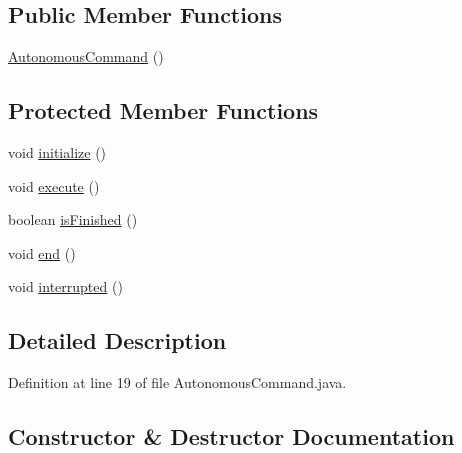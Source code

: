 \subsection*{Public Member Functions}
\begin{DoxyCompactItemize}
\item 
\mbox{\hyperlink{classorg_1_1usfirst_1_1frc3707_1_1_creedence_1_1commands_1_1_autonomous_command_abb380ba5f74cdfe90027c828ddff9e5a}{Autonomous\+Command}} ()
\end{DoxyCompactItemize}
\subsection*{Protected Member Functions}
\begin{DoxyCompactItemize}
\item 
void \mbox{\hyperlink{classorg_1_1usfirst_1_1frc3707_1_1_creedence_1_1commands_1_1_autonomous_command_a190643d1fbd6088bed200706ef5bb825}{initialize}} ()
\item 
void \mbox{\hyperlink{classorg_1_1usfirst_1_1frc3707_1_1_creedence_1_1commands_1_1_autonomous_command_a5055d48fcec4e2a2104e75a774e6d5ce}{execute}} ()
\item 
boolean \mbox{\hyperlink{classorg_1_1usfirst_1_1frc3707_1_1_creedence_1_1commands_1_1_autonomous_command_aab1635c858244c42e519892f18e0cff2}{is\+Finished}} ()
\item 
void \mbox{\hyperlink{classorg_1_1usfirst_1_1frc3707_1_1_creedence_1_1commands_1_1_autonomous_command_a685f8c8624dd1004081cc4cae39f395a}{end}} ()
\item 
void \mbox{\hyperlink{classorg_1_1usfirst_1_1frc3707_1_1_creedence_1_1commands_1_1_autonomous_command_a20b955c7af5792e580e7adeb41ab8a4b}{interrupted}} ()
\end{DoxyCompactItemize}


\subsection{Detailed Description}


Definition at line 19 of file Autonomous\+Command.\+java.



\subsection{Constructor \& Destructor Documentation}
\mbox{\label{classorg_1_1usfirst_1_1frc3707_1_1_creedence_1_1commands_1_1_autonomous_command_abb380ba5f74cdfe90027c828ddff9e5a}} 
